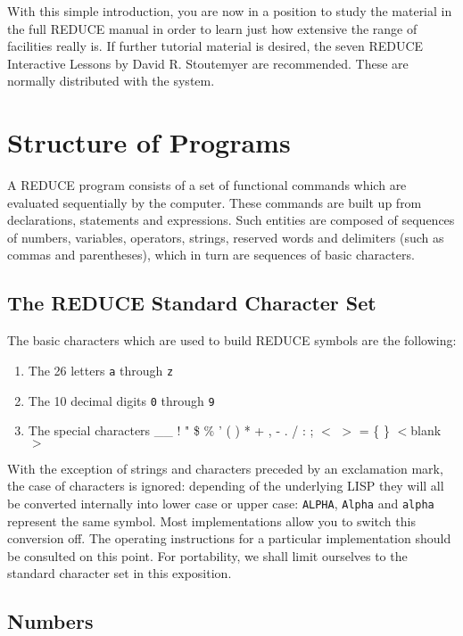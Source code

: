 \documentclass[11pt,letterpaper]{book}
\newcommand{\REDUCE}{REDUCE}
\begin{document}
With this simple introduction, you are now in a position to study the
material in the full {\REDUCE} manual in order to learn just how extensive
the range of facilities really is.  If further tutorial material is
desired, the seven {\REDUCE} Interactive Lessons by David R. Stoutemyer are
recommended.  These are normally distributed with the system.

\chapter{Structure of Programs}

A {\REDUCE} program consists of a set of
functional commands which are evaluated sequentially by the computer.
These commands are built up from declarations, statements and expressions.
Such entities are composed of sequences of numbers, variables, operators,
strings, reserved words and delimiters (such as commas and parentheses),
which in turn are sequences of basic characters.

\section{The {\REDUCE} Standard Character Set}

The basic characters which are used to build
{\REDUCE} symbols are the following:
\begin{enumerate}
\item The 26 letters {\tt a} through {\tt z}
\item The 10 decimal digits {\tt 0} through {\tt 9}
\item The special characters \_\_ ! " \$ \% ' ( ) * + , - . / : ; $<$ $>$
      = \{ \} $<$blank$>$
\end{enumerate}
With the exception of strings and characters preceded by an
exclamation mark, the case
of characters is ignored: depending of the underlying LISP
they will all be converted internally into lower case or
upper case: {\tt ALPHA}, {\tt Alpha} and {\tt alpha}
represent the same symbol.  Most implementations allow you to switch
this conversion off. The operating instructions for a particular
implementation should be consulted on this point. For portability, we
shall limit ourselves to the standard character set in this exposition.

\section{Numbers}
\end{document}
